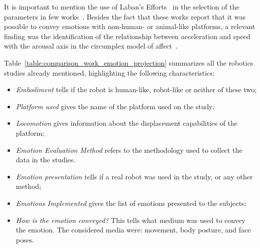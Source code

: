It is important to mention the use of Laban’s Efforts~\cite{Laban1968} in the selection of the parameters in few works~\cite{BarakovaL10, Sharma2013}. Besides the fact that these works report that it was possible to convey emotions with non-human- or animal-like platforms, a relevant finding was the identification of the relationship between acceleration and speed with the arousal axis in the circumplex model of affect~\cite{Petta2010}.

Table~\ref{table:comparison_work_emotion_projection} summarizes all the robotics studies already mentioned, highlighting the following characteristics:
\begin{itemize}

	\item \textit{Embodiment} tells if the robot is human-like, robot-like or neither of these two;

	\item \textit{Platform used} gives the name of the platform used on the study;

	\item \textit{Locomotion} gives information about the  displacement capabilities of the platform;

	\item \textit{Emotion Evaluation Method} refers to the methodology used to collect the data in the studies.

	\item \textit{Emotion presentation} tells if a real robot was used in the study, or any other method;

	\item \textit{Emotions Implemented} gives the list of emotions presented to the subjects;
	
	\item \textit{How is the emotion conveyed?} This tells what medium was used to convey the emotion. The considered media were: movement, body posture, and face poses.
	
\end{itemize}



